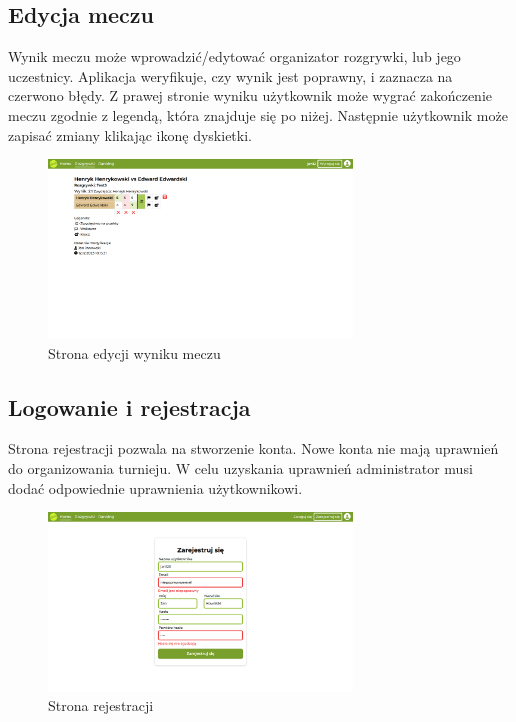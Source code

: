 \documentclass[shortabstract]{iithesis}
\begin{document}
\subsection{Edycja meczu}
Wynik meczu może wprowadzić/edytować organizator rozgrywki, lub jego uczestnicy.
Aplikacja weryfikuje, czy wynik jest poprawny, i zaznacza na czerwono błędy. Z prawej stronie wyniku
użytkownik może wygrać zakończenie meczu zgodnie z legendą, która znajduje się po niżej.
Następnie użytkownik może zapisać zmiany klikając ikonę dyskietki.

\begin{figure}[H]
    \centering
    \includegraphics[width=0.72\textwidth,valign=t]{assets/interfejs/mecz_desktop.png}
    \caption{Strona edycji wyniku meczu}
\end{figure}

\subsection{Logowanie i rejestracja}
Strona rejestracji pozwala na stworzenie konta. Nowe konta nie mają uprawnień do organizowania turnieju.
W celu uzyskania uprawnień administrator musi dodać odpowiednie uprawnienia użytkownikowi.
\begin{figure}[H]
    \centering
    \includegraphics[width=0.72\textwidth,valign=t]{assets/interfejs/rejestracja_desktop.png}
    \caption{Strona rejestracji}
\end{figure}
\end{document}
